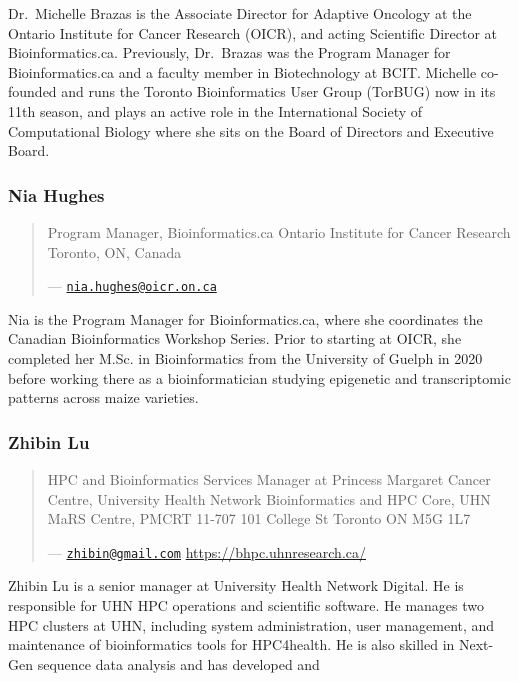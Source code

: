 \documentclass[
]{book}
\begin{document}
Dr.~Michelle Brazas is the Associate Director for Adaptive Oncology at the
Ontario Institute for Cancer Research (OICR), and acting Scientific Director at Bioinformatics.ca.
Previously, Dr.~Brazas was the Program Manager for Bioinformatics.ca and a faculty member in
Biotechnology at BCIT. Michelle co-founded and runs the Toronto Bioinformatics User Group
(TorBUG) now in its 11th season, and plays an active role in the International Society of
Computational Biology where she sits on the Board of Directors and Executive Board.

\subsubsection{Nia Hughes}\label{nia-hughes}

\begin{quote}
Program Manager, Bioinformatics.ca
Ontario Institute for Cancer Research
Toronto, ON, Canada

--- \href{mailto:nia.hughes@oicr.on.ca}{\nolinkurl{nia.hughes@oicr.on.ca}}
\end{quote}

Nia is the Program Manager for Bioinformatics.ca, where she coordinates the Canadian
Bioinformatics Workshop Series. Prior to starting at OICR, she completed her M.Sc. in
Bioinformatics from the University of Guelph in 2020 before working there as a bioinformatician
studying epigenetic and transcriptomic patterns across maize varieties.

\subsubsection{Zhibin Lu}\label{zhibin-lu}

\begin{quote}
HPC and Bioinformatics Services Manager at Princess Margaret
Cancer Centre, University Health Network
Bioinformatics and HPC Core, UHN
MaRS Centre, PMCRT 11-707
101 College St
Toronto ON M5G 1L7

--- \href{mailto:zhibin@gmail.com}{\nolinkurl{zhibin@gmail.com}}
\url{https://bhpc.uhnresearch.ca/}
\end{quote}

Zhibin Lu is a senior manager at University Health Network Digital. He is responsible for UHN
HPC operations and scientific software. He manages two HPC clusters at UHN, including
system administration, user management, and maintenance of bioinformatics tools for
HPC4health. He is also skilled in Next-Gen sequence data analysis and has developed and
\end{document}
